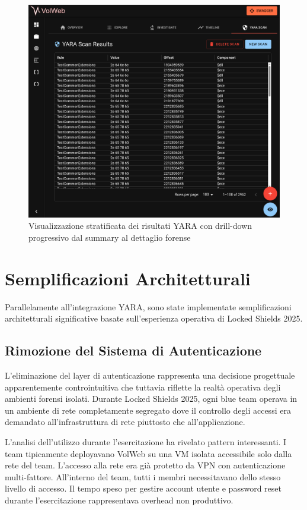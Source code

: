 \begin{figure}[H]
\centering
\includegraphics[width=1\linewidth]{images/volweb-esteso/volweb-scanresult.png}
\caption{Visualizzazione stratificata dei risultati YARA con drill-down progressivo dal summary al dettaglio forense}
\end{figure}

\section{Semplificazioni Architetturali}

Parallelamente all'integrazione YARA, sono state implementate semplificazioni architetturali significative basate sull'esperienza operativa di Locked Shields 2025.

\subsection{Rimozione del Sistema di Autenticazione}

L'eliminazione del layer di autenticazione rappresenta una decisione progettuale apparentemente controintuitiva che tuttavia riflette la realtà operativa degli ambienti forensi isolati. Durante Locked Shields 2025, ogni blue team operava in un ambiente di rete completamente segregato dove il controllo degli accessi era demandato all'infrastruttura di rete piuttosto che all'applicazione.

L'analisi dell'utilizzo durante l'esercitazione ha rivelato pattern interessanti. I team tipicamente deployavano VolWeb su una VM isolata accessibile solo dalla rete del team. L'accesso alla rete era già protetto da VPN con autenticazione multi-fattore. All'interno del team, tutti i membri necessitavano dello stesso livello di accesso. Il tempo speso per gestire account utente e password reset durante l'esercitazione rappresentava overhead non produttivo.

